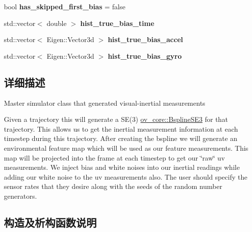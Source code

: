 \begin{DoxyCompactItemize}
\mbox{\label{classov__msckf_1_1Simulator_a91a588194049105eff55c365fd22a780}} 
bool {\bfseries has\+\_\+skipped\+\_\+first\+\_\+bias} = false
\item 
\mbox{\label{classov__msckf_1_1Simulator_a9f1e507ae501f7c579ee720c8e045ba4}} 
std\+::vector$<$ double $>$ {\bfseries hist\+\_\+true\+\_\+bias\+\_\+time}
\item 
\mbox{\label{classov__msckf_1_1Simulator_a4df35c4576725f47ad3a04def6358433}} 
std\+::vector$<$ Eigen\+::\+Vector3d $>$ {\bfseries hist\+\_\+true\+\_\+bias\+\_\+accel}
\item 
\mbox{\label{classov__msckf_1_1Simulator_a449f347bf5e1354efbfc8467454ff442}} 
std\+::vector$<$ Eigen\+::\+Vector3d $>$ {\bfseries hist\+\_\+true\+\_\+bias\+\_\+gyro}
\end{DoxyCompactItemize}


\subsection{详细描述}
Master simulator class that generated visual-\/inertial measurements 

Given a trajectory this will generate a S\+E(3) \hyperlink{classov__core_1_1BsplineSE3}{ov\+\_\+core\+::\+Bspline\+S\+E3} for that trajectory. This allows us to get the inertial measurement information at each timestep during this trajectory. After creating the bspline we will generate an environmental feature map which will be used as our feature measurements. This map will be projected into the frame at each timestep to get our \char`\"{}raw\char`\"{} uv measurements. We inject bias and white noises into our inertial readings while adding our white noise to the uv measurements also. The user should specify the sensor rates that they desire along with the seeds of the random number generators. 

\subsection{构造及析构函数说明}
\mbox{\label{classov__msckf_1_1Simulator_ab36fe774609d9e764219266867e21c4d}} 
